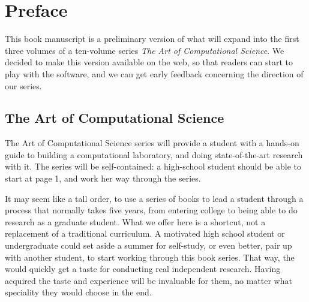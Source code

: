 \newpage           %
\thispagestyle{empty}      %
\mbox{}                    %
\newpage                   %


\chapter*{Preface}

This book manuscript is a preliminary version of what will expand
into the first three volumes of a ten-volume series {\it The Art of
Computational Science}.  We decided to make this version available
on the web, so that readers can start to play with the software, and
we can get early feedback concerning the direction of our series.

\section*{The Art of Computational Science}

The Art of Computational Science series will provide a student with a
hands-on guide to building a computational laboratory, and doing
state-of-the-art research with it.  The series will be self-contained:
a high-school student should be able to start at page 1, and work her
way through the series.

It may seem like a tall order, to use a series of books to lead a
student through a process that normally takes five years, from
entering college to being able to do research as a graduate student.
What we offer here is a shortcut, not a replacement of a traditional
curriculum.  A motivated high school student or undergraduate could
set aside a summer for self-study, or even better, pair up with
another student, to start working through this book series.  That way,
the would quickly get a taste for conducting real independent research.
Having acquired the taste and experience will be invaluable for them,
no matter what speciality they would choose in the end.


